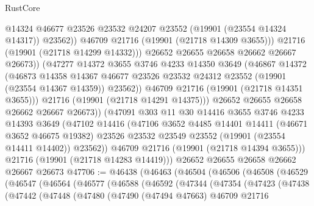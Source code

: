\begin{lexlean}{RustCore}
\begin{coremodule}
                        @14324
                        @46677
                        @23526
                        @23532
                        @24207
                        @23552
                        (@19901 (@23554 @14324 @14317))
                        @23562))
                    @46709
                    @21716
                    (@19901 (@21718 @14309 @3655)))
                  @21716
                  (@19901 (@21718 @14299 @14332)))
                @26652
                @26655
                @26658
                @26662
                @26667
                @26673))
            (@47277
              @14372
              @3655
              @3746
              @4233
              @14350
              @3649
              (@46867
                @14372
                (@46873
                  @14358
                  @14367
                  @46677
                  @23526
                  @23532
                  @24312
                  @23552
                  (@19901 (@23554 @14367 @14359))
                  @23562))
              @46709
              @21716
              (@19901 (@21718 @14351 @3655)))
            @21716
            (@19901 (@21718 @14291 @14375)))
          @26652
          @26655
          @26658
          @26662
          @26667
          @26673))
      (@47091
        @303
        @11
        @30
        @14416
        @3655
        @3746
        @4233
        @14393
        @3649
        (@47102
          @14416
          (@47106
            @3652
            @4485
            @14401
            @14411
            (@46671 @3652 @46675 @19382)
            @23526
            @23532
            @23549
            @23552
            (@19901 (@23554 @14411 @14402))
            @23562))
        @46709
        @21716
        (@19901 (@21718 @14394 @3655)))
      @21716
      (@19901 (@21718 @14283 @14419)))
    @26652
    @26655
    @26658
    @26662
    @26667
    @26673
@47706 := @46438
    (@46463
      (@46504
        (@46506
          (@46508
            (@46529
              (@46547
                (@46564
                  (@46577
                    (@46588
                      (@46592
                        (@47344
                          (@47354
                            (@47423
                              (@47438
                                (@47442
                                  (@47448
                                    (@47480
                                      (@47490
                                        (@47494 @47663)
                                        @46709
                                        @21716

\end{coremodule}
\end{lexlean}
